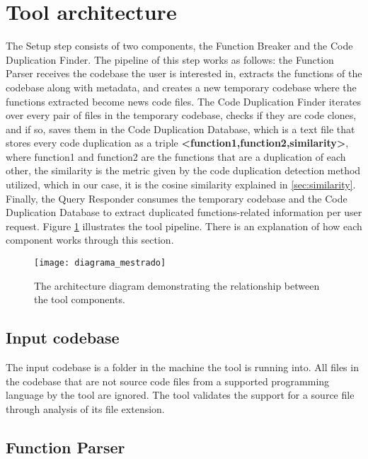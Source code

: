 \en

\section{Tool architecture}
\label{subsec:architecture}

The Setup step consists of two components, the Function Breaker and the Code Duplication Finder. 
The pipeline of this step works as follows: the Function Parser receives the codebase the user 
is interested in, extracts the functions of the codebase along with metadata, and creates a new 
temporary codebase where the functions extracted become news code files. The Code Duplication Finder 
iterates over every pair of files in the temporary codebase, checks if they are code clones, and if 
so, saves them in the Code Duplication Database, which is a text file that stores every code duplication 
as a triple \textbf{<function1,function2,similarity>}, where function1 and function2 are the functions 
that are a duplication of each other, the similarity is the metric given by the code duplication detection 
method utilized, which in our case, it is the cosine similarity explained in \ref{sec:similarity}. 
Finally, the Query Responder consumes the temporary codebase and the Code Duplication Database to 
extract duplicated functions-related information per user request. Figure \ref{fig:diagram} illustrates 
the tool pipeline. There is an explanation of how each component works through this section.

\begin{figure}
\texttt{[image: diagrama\_mestrado]}
\caption{The architecture diagram demonstrating the relationship between the tool components.}
\label{fig:diagram}
\end{figure}

\subsection{Input codebase}

The input codebase is a folder in the machine the tool is running into. All files in the codebase 
that are not source code files from a supported programming language by the tool are ignored. The 
tool validates the support for a source file through analysis of its file extension.

\subsection{Function Parser}

